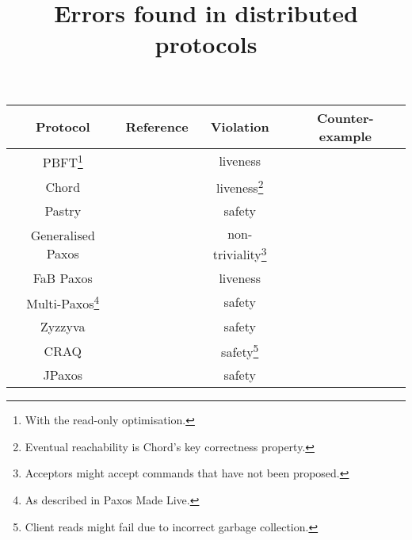 \documentclass{article}
\title{Errors found in distributed protocols}
\date{}
\begin{document}
\maketitle

\begin{center}
\begin{tabular}{ c c c c }
    \toprule
    Protocol & Reference & Violation & Counter-example \\
    \midrule

    PBFT\footnote{With the read-only optimisation.} &
    \cite{castroPracticalByzantineFault1999} & liveness &
    \cite{bergerMakingReadsBFT2021} \\

    Chord & \cite{stoicaChordScalablePeertopeer2001,
    liben-nowellAnalysisEvolutionPeertopeer2002} &
    liveness\footnote{Eventual reachability is Chord's key
    correctness property.} & \cite{zaveUsingLightweightModeling2012,
    zaveReasoningIdentifierSpaces2017} \\

    Pastry & \cite{rowstronPastryScalableDecentralized2001} & safety &
    \cite{azmyRigorousCorrectnessProof2016, azmyMachinecheckedCorrectnessProof2018}\\

    Generalised Paxos & \cite{lamportGeneralizedConsensusPaxos2005} &
    non-triviality\footnote{Acceptors might accept commands that have not been
    proposed.} & \cite{sutraFastGenuineGeneralized2010} \\

    FaB Paxos & \cite{martinFastByzantineConsensus2005,
    martinFastByzantineConsensus2006} & liveness &
    \cite{abrahamRevisitingFastPractical2017} \\

    Multi-Paxos\footnote{As described in Paxos Made Live.} &
    \cite{chandraPaxosMadeLive2007} & safety &
    \cite{michaelRecoveringSharedObjects2017} \\

    Zyzzyva & \cite{kotlaZyzzyvaSpeculativeByzantine2007,
    kotlaZyzzyvaSpeculativeByzantine2009} & safety &
    \cite{abrahamRevisitingFastPractical2017} \\

    CRAQ & \cite{terraceObjectStorageCRAQ2009} & safety\footnote{Client reads
    might fail due to incorrect garbage collection.} &
    \cite{whittakerCRAQBug2020} \\

    JPaxos & \cite{konczakJPaxosStateMachine2011} & safety &
    \cite{michaelRecoveringSharedObjects2017} \\


\end{tabular}
\end{center}
\end{document}
